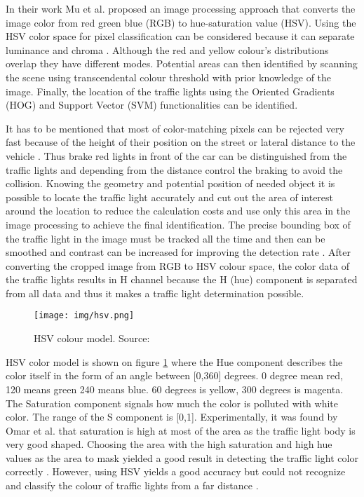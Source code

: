 \documentclass[letterpaper, 10 pt, conference]{ieeeconf} %
\begin{document}
In their work Mu et al. \cite{c9} \cite{c7} proposed an image processing approach that converts the image color from red green blue (RGB) to hue-saturation value (HSV). Using the HSV color space for pixel classification can be considered because it can separate luminance and chroma \cite{c4}. Although the red and yellow colour's distributions overlap they have different modes. Potential areas can then identified by scanning the scene using transcendental colour threshold with prior knowledge of the image. Finally, the location of the traffic lights using the Oriented Gradients (HOG) and Support Vector (SVM) functionalities can be identified.

It has to be mentioned that most of color-matching pixels can be rejected very fast because of the height of their position on the street or lateral distance to the vehicle \cite{c4}. Thus brake red lights in front of the car can be distinguished from the traffic lights and depending from the distance control the braking to avoid the collision. Knowing the geometry and potential position of needed object it is possible to locate the traffic light accurately and cut out the area of interest around the location to reduce the calculation costs and use only this area in the image processing to achieve the final identification. The precise bounding box of the traffic light in the image must be tracked all the time and then can be smoothed and contrast can be increased for improving the detection rate \cite{c7}. After converting the cropped image from RGB to HSV colour space, the color data of the traffic lights results in H channel because the H (hue) component is separated from all data and thus it makes a traffic light determination possible.

\begin{figure}[thpb]
	\centering
	\texttt{[image: img/hsv.png]}
	\caption{HSV colour model. Source: \cite{c7}} 
	\label{hsv}
\end{figure}

HSV color model is shown on figure \ref{hsv} where the Hue component describes the color itself in the form of an angle between [0,360] degrees. 0 degree mean red, 120 means green 240 means blue. 60 degrees is yellow, 300 degrees is magenta. The Saturation component signals how much the color is polluted with white color. The range of the S component is [0,1]. Experimentally, it was found by Omar et al. that saturation is high at most of the area as the traffic light body is very good shaped. Choosing the area with the high saturation and high hue values as the area to mask yielded a good result in detecting the traffic light color correctly \cite{c7}. However, using HSV yields a good accuracy but could not recognize and classify the colour of traffic lights from a far distance \cite{c7}.
\end{document}
